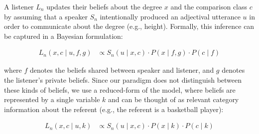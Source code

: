 \documentclass[doc]{apa6}
\begin{document}
%
%
%
%
%

A listener $L_n$ updates their beliefs about the degree $x$ and the comparison class $c$ by assuming that a speaker $S_n$ intentionally produced an adjectival utterance $u$ in order to communicate about the degree (e.g., height).
Formally, this inference can be captured in a Bayesian formulation:

\begin{align}
L_n(x, c \mid u, f, g) &\propto S_n(u \mid x, c) \cdot P(x \mid f, g) \cdot P(c \mid f) \label{eq:L2} 
\end{align}

\noindent where $f$ denotes the beliefs shared between speaker and listener, and $g$ denotes the listener's private beliefs. Since our paradigm does not distinguish between these kinds of beliefs, we use a reduced-form of the model, where beliefs are represented by a single variable $k$ and can be thought of as relevant category information about the referent (e.g., the referent is a basketball player): 

\begin{align}
L_n(x, c \mid u, k) &\propto S_n(u \mid x, c) \cdot P(x \mid k) \cdot P(c \mid k) \label{eq:L2} 
\end{align}
\end{document}
